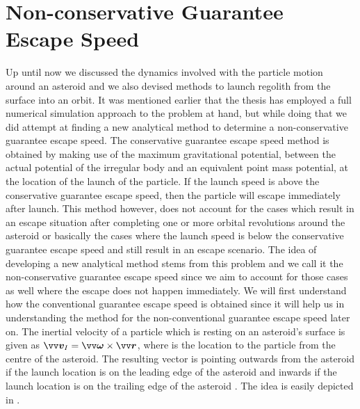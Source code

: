 \section{Non-conservative Guarantee Escape Speed}
\label{sec:escape_speed_derivation}
Up until now we discussed the dynamics involved with the particle motion around an asteroid and we also devised methods to launch regolith from the surface into an orbit. It was mentioned earlier that the thesis has employed a full numerical simulation approach to the problem at hand, but while doing that we did attempt at finding a new analytical method to determine a non-conservative guarantee escape speed.
%
\newline\newline
%
The conservative guarantee escape speed method is obtained by making use of the maximum gravitational potential, between the actual potential of the irregular body and an equivalent point mass potential, at the location of the launch of the particle. If the launch speed is above the conservative guarantee escape speed, then the particle will escape immediately after launch. This method however, does not account for the cases which result in an escape situation after completing one or more orbital revolutions around the asteroid or basically the cases where the launch speed is below the conservative guarantee escape speed and still result in an escape scenario. The idea of developing a new analytical method stems from this problem and we call it the non-conservative guarantee escape speed since we aim to account for those cases as well where the escape does not happen immediately.
%
\newline\newline
%
We will first understand how the conventional guarantee escape speed is obtained since it will help us in understanding the method for the non-conventional guarantee escape speed later on. The inertial velocity of a particle which is resting on an asteroid's surface is given as $\bv{v}_I = \bv{\omega} \times \bv{r}$, where  is the location to the particle from the centre of the asteroid. The resulting vector is pointing outwards from the asteroid if the launch location is on the leading edge of the asteroid and inwards if the launch location is on the trailing edge of the asteroid \parencite{scheeresBook}. The idea is easily depicted in .
